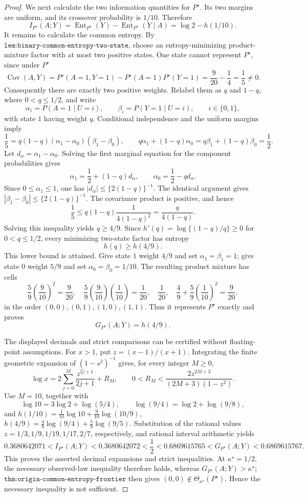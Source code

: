 \documentclass{article}
\begin{document}
\begin{proof}
We next calculate the two information quantities for \(P^\star\).  Its two margins are uniform, and its crossover probability is \(1/10\).  Therefore
\[
 I_{P^\star}(A;Y)=\operatorname{Ent}_{P^\star}(Y)-
 \operatorname{Ent}_{P^\star}(Y\mid A)=\log2-h(1/10).
\]
It remains to calculate the common entropy.  By \(\texttt{lem:binary-common-entropy-two-state}\), choose an entropy-minimizing product-mixture factor with at most two positive states.  One state cannot represent \(P^\star\), since under \(P^\star\)
\[
 \operatorname{Cov}(A,Y)=P^\star(A=1,Y=1)-P^\star(A=1)P^\star(Y=1)
 =\frac9{20}-\frac14=\frac15\ne0.
\]
Consequently there are exactly two positive weights.  Relabel them as \(q\) and \(1-q\), where \(0<q\leq1/2\), and write
\[
 \alpha_i=P(A=1\mid U=i),\qquad
 \beta_i=P(Y=1\mid U=i),\qquad i\in\{0,1\},
\]
with state \(1\) having weight \(q\).  Conditional independence and the uniform margins imply
\[
 \frac15=q(1-q)(\alpha_1-\alpha_0)(\beta_1-\beta_0),
 \qquad q\alpha_1+(1-q)\alpha_0=q\beta_1+(1-q)\beta_0=\frac12.
\]
Let \(d_\alpha=\alpha_1-\alpha_0\).  Solving the first marginal equation for the component probabilities gives
\[
 \alpha_1=\frac12+(1-q)d_\alpha,
 \qquad \alpha_0=\frac12-qd_\alpha.
\]
Since \(0\leq\alpha_1\leq1\), one has \(|d_\alpha|\leq\{2(1-q)\}^{-1}\).  The identical argument gives \(|\beta_1-\beta_0|\leq\{2(1-q)\}^{-1}\).  The covariance product is positive, and hence
\[
 \frac15\leq q(1-q)\frac1{4(1-q)^2}=\frac{q}{4(1-q)}.
\]
Solving this inequality yields \(q\geq4/9\).  Since \(h'(q)=\log\{(1-q)/q\}\geq0\) for \(0<q\leq1/2\), every minimizing two-state factor has entropy
\[
 h(q)\geq h(4/9).
\]
This lower bound is attained.  Give state \(1\) weight \(4/9\) and set \(\alpha_1=\beta_1=1\); give state \(0\) weight \(5/9\) and set \(\alpha_0=\beta_0=1/10\).  The resulting product mixture has cells
\[
 \frac59\left(\frac9{10}\right)^2=\frac9{20},\quad
 \frac59\left(\frac9{10}\right)\left(\frac1{10}\right)=\frac1{20},\quad
 \frac1{20},\quad
 \frac49+\frac59\left(\frac1{10}\right)^2=\frac9{20},
\]
in the order \((0,0),(0,1),(1,0),(1,1)\).  Thus it represents \(P^\star\) exactly and proves
\[
 G_{P^\star}(A;Y)=h(4/9).
\]

The displayed decimals and strict comparisons can be certified without floating-point assumptions.  For \(x>1\), put \(z=(x-1)/(x+1)\).  Integrating the finite geometric expansion of \((1-s^2)^{-1}\) gives, for every integer \(M\geq0\),
\[
 \log x=2\sum_{j=0}^{M}\frac{z^{2j+1}}{2j+1}+R_M,
 \qquad 0<R_M<\frac{2z^{2M+3}}{(2M+3)(1-z^2)}.
\]
Use \(M=10\), together with
\[
 \log10=3\log2+\log(5/4),\qquad
 \log(9/4)=\log2+\log(9/8),
\]
and \(h(1/10)=\tfrac1{10}\log10+\tfrac9{10}\log(10/9)\), \(h(4/9)=\tfrac49\log(9/4)+\tfrac59\log(9/5)\).  Substitution of the rational values \(z=1/3,1/9,1/19,1/17,2/7\), respectively, and rational interval arithmetic yields
\[
 0.3680642071<I_{P^\star}(A;Y)<0.3680642072
 <\frac12
 <0.6869615765<G_{P^\star}(A;Y)<0.6869615767.
\]
This proves the asserted decimal expansions and strict inequalities.  At \(\kappa^\star=1/2\), the necessary observed-law inequality therefore holds, whereas \(G_{P^\star}(A;Y)>\kappa^\star\); \(\texttt{thm:origin-common-entropy-frontier}\) then gives \((0,0)\notin\Theta_{\kappa^\star}(P^\star)\).  Hence the necessary inequality is not sufficient.


\end{proof}
\end{document}

